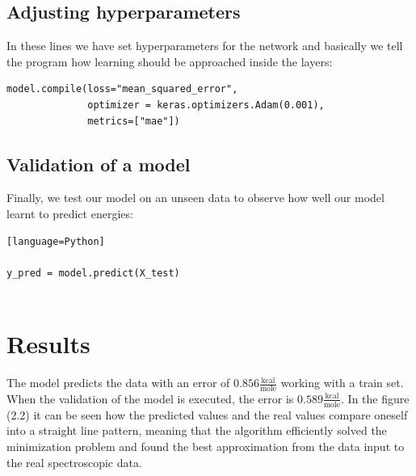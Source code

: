 \documentclass[a4paper,oneside,openright,11pt]{book}
\begin{document}
\subsection{Adjusting hyperparameters}

In these lines we have set hyperparameters for the network and basically we tell the program how learning should be approached inside the layers: 

\begin{verbatim}
model.compile(loss="mean_squared_error",
              optimizer = keras.optimizers.Adam(0.001),
              metrics=["mae"])

\end{verbatim}

\subsection{Validation of a model}

Finally, we test our model on an unseen data to observe how well our model learnt to predict energies:

\begin{verbatim}[language=Python]

y_pred = model.predict(X_test)


\end{verbatim}

\section{Results}


The model predicts the data with an error of $0.856 \frac{\text{kcal}}{\text{mole}}$ working with a train set. When the validation of the model is executed, the error is $0.589 \frac{\text{kcal}}{\text{mole}}$. In the figure (2.2) it can be seen how the predicted values and the real values compare oneself into a straight line pattern, meaning that the algorithm efficiently solved the minimization problem and found the best approximation from the data input to the real spectroscopic data. 
\end{document}
